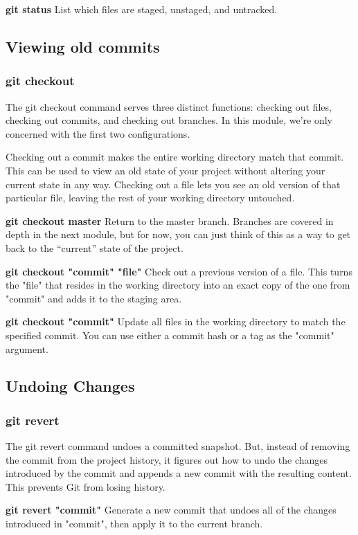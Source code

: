 \documentclass{article}
\begin{document}
		\textbf{git status}
		List which files are staged, unstaged, and untracked.

	\subsection{Viewing old commits}
	\subsubsection{git checkout}
		The git checkout command serves three distinct functions: checking out files, checking out commits, and checking out branches. In this module, we’re only concerned with the first two configurations.

		Checking out a commit makes the entire working directory match that commit. This can be used to view an old state of your project without altering your current state in any way. Checking out a file lets you see an old version of that particular file, leaving the rest of your working directory untouched.

		\textbf{git checkout master}
			Return to the master branch. Branches are covered in depth in the next module, but for now, you can just think of this as a way to get back to the “current” state of the project.

		\textbf{git checkout "commit" "file"}
		Check out a previous version of a file. This turns the "file" that resides in the working directory into an exact copy of the one from "commit" and adds it to the staging area.

		\textbf{git checkout "commit"}
		Update all files in the working directory to match the specified commit. You can use either a commit hash or a tag as the "commit" argument.

	\subsection{Undoing Changes}
	\subsubsection{git revert}

		The git revert command undoes a committed snapshot. But, instead of removing the commit from the project history, it figures out how to undo the changes introduced by the commit and appends a new commit with the resulting content. This prevents Git from losing history.

		\textbf{git revert "commit"}
		Generate a new commit that undoes all of the changes introduced in "commit", then apply it to the current branch.
\end{document}
